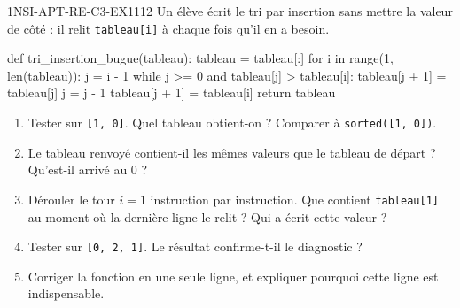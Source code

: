 

\begin{exercice}{1NSI-APT-RE-C3-EX1}{1}{12}
Un élève écrit le tri par insertion sans mettre la valeur de côté : il relit
\lstinline{tableau[i]} à chaque fois qu'il en a besoin.
\begin{python}
def tri_insertion_bugue(tableau):
    tableau = tableau[:]
    for i in range(1, len(tableau)):
        j = i - 1
        while j >= 0 and tableau[j] > tableau[i]:
            tableau[j + 1] = tableau[j]
            j = j - 1
        tableau[j + 1] = tableau[i]
    return tableau
\end{python}
\begin{enumerate}
  \item Tester sur \lstinline{[1, 0]}. Quel tableau obtient-on ? Comparer à
    \lstinline{sorted([1, 0])}.
  \item Le tableau renvoyé contient-il les mêmes valeurs que le tableau de départ ?
    Qu'est-il arrivé au $0$ ?
  \item Dérouler le tour $i=1$ instruction par instruction. Que contient
    \lstinline{tableau[1]} au moment où la dernière ligne le relit ? Qui a écrit cette
    valeur ?
  \item Tester sur \lstinline{[0, 2, 1]}. Le résultat confirme-t-il le diagnostic ?
  \item Corriger la fonction en une seule ligne, et expliquer pourquoi cette ligne est
    indispensable.
\end{enumerate}
\end{exercice}


